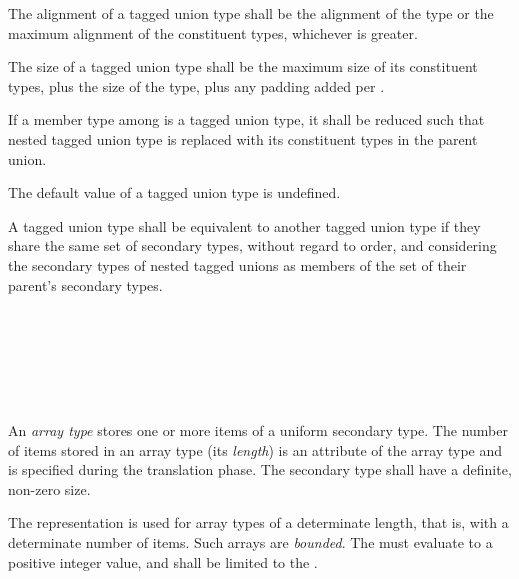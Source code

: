 \specsubsubitem
The alignment of a tagged union type shall be the alignment of the
 type or the maximum alignment of the constituent types,
whichever is greater.

\specsubsubitem
The size of a tagged union type shall be the maximum size of its constituent
types, plus the size of the  type, plus any padding added per
.

\specsubsubitem
If a member type among  is a tagged union type, it
shall be reduced such that nested tagged union type is replaced with its
constituent types in the parent union.


\specsubsubitem
The default value of a tagged union type is undefined.

\specsubsubitem
A tagged union type shall be equivalent to another tagged union type if they
share the same set of secondary types, without regard to order, and considering
the secondary types of nested tagged unions as members of the set of their
parent's secondary types.



\begin{grammar}
 \\
	\terminal{[} \terminal{]}  \\
	\terminal{[}  \terminal{]}  \\
	\terminal{[} \terminal{*} \terminal{]}  \\
	\terminal{[} \terminal{\_} \terminal{]}  \\
\end{grammar}

\specsubsubitem
An \textit{array type} stores one or more items of a uniform secondary type.
The number of items stored in an array type (its \textit{length}) is an
attribute of the array type and is specified during the translation phase. The
secondary type shall have a definite, non-zero size.

\specsubsubitem
The  representation is used for array types of a
determinate length, that is, with a determinate number of items. Such arrays
are \textit{bounded}. The  must evaluate to a positive
integer value, and shall be limited to the .


